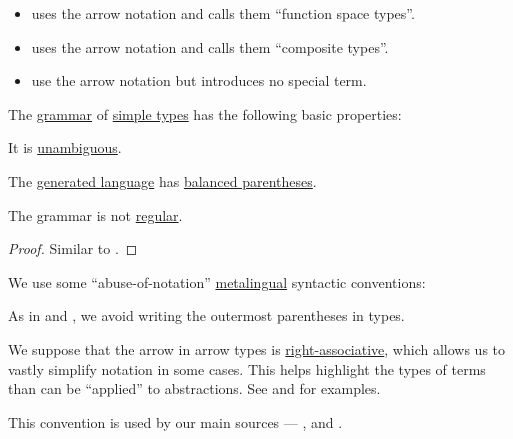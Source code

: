 \begin{remark}
\begin{itemize}
    \item {} uses the arrow notation and calls them \enquote{function space types}.

    \item {} uses the arrow notation and calls them \enquote{composite types}.

    \item {} use the arrow notation but introduces no special term.
  \end{itemize}
\end{remark}

\begin{proposition}\label{thm:simple_type_grammar}
  The \hyperref[def:formal_grammar]{grammar} of \hyperref[def:simple_type]{simple types} has the following basic properties:
  \begin{thmenum}
     It is \hyperref[def:grammar_ambiguity]{unambiguous}.

     The \hyperref[def:formal_grammar/language]{generated language} has \hyperref[def:paired_delimiters]{balanced parentheses}.

     The grammar is not \hyperref[def:chomsky_hierarchy/regular]{regular}.
  \end{thmenum}
\end{proposition}
\begin{proof}
  Similar to .
\end{proof}

\begin{remark}\label{rem:simple_type_parentheses}
  We use some \enquote{abuse-of-notation} \hyperref[con:metalogic]{metalingual} syntactic conventions:
  \begin{thmenum}
     As in  and , we avoid writing the outermost parentheses in types.

     We suppose that the arrow in arrow types is \hyperref[rem:binary_operation_syntax_trees/associativity]{right-associative}, which allows us to vastly simplify notation in some cases. This helps highlight the types of terms than can be \enquote{applied} to abstractions. See  and  for examples.

    This convention is used by our main sources --- ,  and .
  \end{thmenum}
\end{remark}

